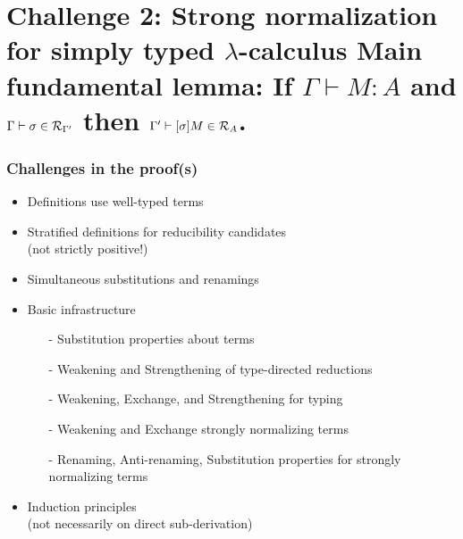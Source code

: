 \documentclass{beamer}
\begin{document}
\section{Challenge 2: Strong normalization  for simply typed
  $\lambda$-calculus \newline \newline
Main fundamental lemma: \newline If $\Gamma \vdash M : A$ and $\Gamma \vdash \sigma \in \mathcal{R}_{\Gamma'}$ then $\Gamma' \vdash [\sigma]M \in \mathcal{R}_A$. 
}


\begin{frame}
  \frametitle{Challenges in the proof(s)}
\begin{itemize}
  \item Definitions use well-typed terms 
  \item Stratified definitions for reducibility candidates \\(not
    strictly positive!)
  \item Simultaneous substitutions and renamings 

  \item Basic infrastructure
    \begin{itemize}
    \item[-] Substitution properties about terms
    \item[-] Weakening and Strengthening of type-directed reductions
    \item[-] Weakening, Exchange, and Strengthening for typing
    \item[-] Weakening and Exchange strongly normalizing terms 
    \item[-] Renaming, Anti-renaming, Substitution properties for
      strongly normalizing terms 
    \end{itemize}
  \item Induction principles \\
(not necessarily on direct sub-derivation)
\end{itemize}
\end{frame}
\end{document}
